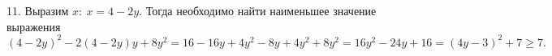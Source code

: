 11. Выразим $x:\ x=4-2y.$ Тогда необходимо найти наименьшее значение выражения $(4-2y)^2-2(4-2y)y+8y^2=16-16y+4y^2-8y+4y^2+8y^2=
16y^2-24y+16=(4y-3)^2+7\geqslant7.$\\
